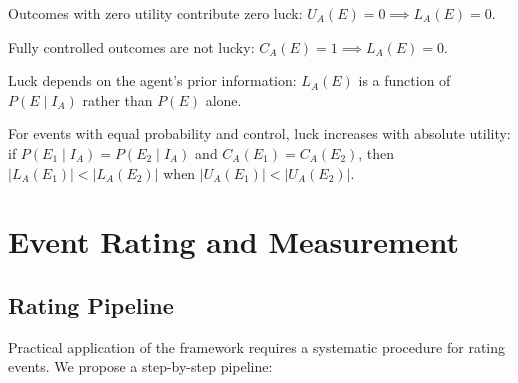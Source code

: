   \begin{assumption}
    [Neutrality] Outcomes with zero utility contribute zero luck:
    $U_{A}(E) = 0 \implies L_{A}(E) = 0$.
  \end{assumption}

  \begin{assumption}
     Fully controlled outcomes are not lucky:
    $C_{A}(E) = 1 \implies L_{A}(E) = 0$.
  \end{assumption}

  \begin{assumption}
     Luck depends on the agent's prior information:
    $L_{A}(E)$ is a function of $P(E \mid I_{A})$ rather than $P(E)$
    alone.
  \end{assumption}

  \begin{assumption}
     For events with equal probability and control,
    luck increases with absolute utility: if $P(E_{1} \mid I_{A}) = P(E_{2}
    \mid I_{A})$ and $C_{A}(E_{1}) = C_{A}(E_{2})$, then
    $|L_{A}(E_{1})| < |L_{A}(E_{2})|$ when
    $|U_{A}(E_{1})| < |U_{A}(E_{2})|$.
  \end{assumption}

  \section{Event Rating and Measurement}
  \label{sec:rating}

  \subsection{Rating Pipeline}

  Practical application of the framework requires a systematic procedure
  for rating events. We propose a step-by-step pipeline:

